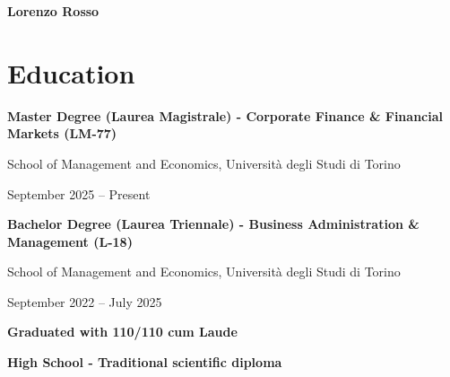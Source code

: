 \documentclass[10pt,a4paper]{article}
\begin{document}

\begin{center}
{\Large\bfseries Lorenzo Rosso}
\end{center}

\vspace{12pt}


\section*{Education}

\vspace{8pt}


\textbf{Master Degree (Laurea Magistrale) - Corporate Finance \& Financial Markets (LM-77)}

\par
School of Management and Economics, Università degli Studi di Torino

\par
September 2025 -- Present

\vspace{12pt}


\textbf{Bachelor Degree (Laurea Triennale) - Business Administration \& Management (L-18)}

\par
School of Management and Economics, Università degli Studi di Torino

\par
September 2022 -- July 2025

\par
\textbf{Graduated with 110/110 cum Laude}

\vspace{12pt}


\textbf{High School - Traditional scientific diploma}
\end{document}
